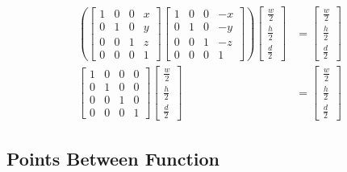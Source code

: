 \documentclass[14pt]{article}
\begin{document}
\begin{equation}
\begin{aligned}
	\left( \begin{bmatrix}
			1 & 0 & 0 & x \\
			0 & 1 & 0 & y \\ 
			0 & 0 & 1 & z \\
			0 & 0 & 0 & 1
	\end{bmatrix}
	\begin{bmatrix}
			1 & 0 & 0 & -x \\
			0 & 1 & 0 & -y \\ 
			0 & 0 & 1 & -z \\
			0 & 0 & 0 & 1
	\end{bmatrix} \right)
	\begin{bmatrix}
			\frac{w}{2} \\[6pt]
			\frac{h}{2} \\[6pt] 
			\frac{d}{2}
	\end{bmatrix}
	&=
	\begin{bmatrix}
			\frac{w}{2} \\[6pt]
			\frac{h}{2} \\[6pt]
			\frac{d}{2}
	\end{bmatrix} \\[6pt]
	\begin{bmatrix}
			1 & 0 & 0 & 0 \\
			0 & 1 & 0 & 0 \\ 
			0 & 0 & 1 & 0 \\
			0 & 0 & 0 & 1
	\end{bmatrix}
	\begin{bmatrix}
			\frac{w}{2} \\[6pt]
			\frac{h}{2} \\[6pt] 
			\frac{d}{2}
	\end{bmatrix}
	&=
	\begin{bmatrix}
			\frac{w}{2} \\[6pt]
			\frac{h}{2} \\[6pt]
			\frac{d}{2}
	\end{bmatrix}
\end{aligned}
\end{equation}

\subsection*{Points Between Function}
\end{document}
